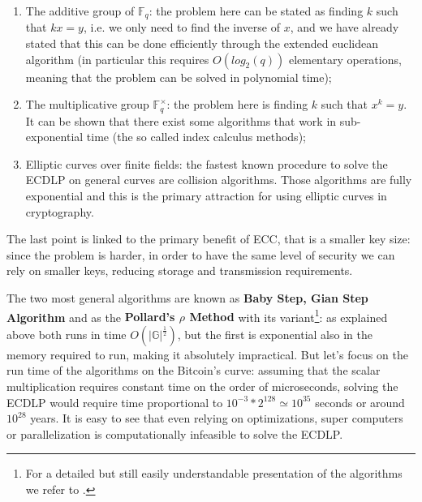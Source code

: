 \begin{enumerate}
	\item The additive group of $\mathbb{F}_q$: the problem here can be stated as finding $k$ such that $kx = y$, i.e. we only need to find the inverse of $x$, and we have already stated that this can be done efficiently through the extended euclidean algorithm (in particular this requires $O(log_2(q))$ elementary operations, meaning that the problem can be solved in polynomial time);
	\item The multiplicative group $\mathbb{F}_q^{\times}$: the problem here is finding $k$ such that $x^k = y$. It can be shown that there exist some algorithms that work in sub-exponential time (the so called index calculus methods);
	\item Elliptic curves over finite fields: the fastest known procedure to solve the ECDLP on general curves are collision algorithms. Those algorithms are fully exponential and this is the primary attraction for using elliptic curves in cryptography.
\end{enumerate}
\noindent
The last point is linked to the primary benefit of ECC, that is a smaller key size: since the problem is harder, in order to have the same level of security we can rely on smaller keys, reducing storage and transmission requirements.

\bigskip
\noindent
The two most general algorithms are known as {\bf Baby Step, Gian Step Algorithm} and as the {\bf Pollard's $\rho$ Method} with its variant\footnote{For a detailed but still easily understandable presentation of the algorithms we refer to \cite{RefWork:4}.}: as explained above both runs in time $O(|\mathbb{G}|^{\frac{1}{2}})$, but the first is exponential also in the memory required to run, making it absolutely impractical. But let's focus on the run time of the algorithms on the Bitcoin's curve: assuming that the scalar multiplication requires constant time on the order of microseconds, solving the ECDLP would require time proportional to $10^{-3} * 2^{128} \simeq 10^{35}$ seconds or around $10^{28}$ years. It is easy to see that even relying on optimizations, super computers or parallelization is computationally infeasible to solve the ECDLP. 
